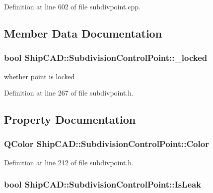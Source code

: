 Definition at line 602 of file subdivpoint.\-cpp.



\subsection{Member Data Documentation}
\hypertarget{classShipCAD_1_1SubdivisionControlPoint_acf4dc0c2a3d4c52847c68a8a412669f5}{
\subsubsection[{\-\_\-locked}]{\setlength{\rightskip}{0pt plus 5cm}bool Ship\-C\-A\-D\-::\-Subdivision\-Control\-Point\-::\-\_\-locked\hspace{0.3cm}{\ttfamily [protected]}}}\label{classShipCAD_1_1SubdivisionControlPoint_acf4dc0c2a3d4c52847c68a8a412669f5}
whether point is locked 

Definition at line 267 of file subdivpoint.\-h.



\subsection{Property Documentation}
\hypertarget{classShipCAD_1_1SubdivisionControlPoint_a8c7a97ce5194163f37a4b655f87bc309}{
\subsubsection[{Color}]{\setlength{\rightskip}{0pt plus 5cm}Q\-Color Ship\-C\-A\-D\-::\-Subdivision\-Control\-Point\-::\-Color\hspace{0.3cm}{\ttfamily [read]}}}\label{classShipCAD_1_1SubdivisionControlPoint_a8c7a97ce5194163f37a4b655f87bc309}


Definition at line 212 of file subdivpoint.\-h.

\hypertarget{classShipCAD_1_1SubdivisionControlPoint_a33a15d8a83f43369313d57a854046ff7}{
\subsubsection[{Is\-Leak}]{\setlength{\rightskip}{0pt plus 5cm}bool Ship\-C\-A\-D\-::\-Subdivision\-Control\-Point\-::\-Is\-Leak\hspace{0.3cm}{\ttfamily [read]}}}\label{classShipCAD_1_1SubdivisionControlPoint_a33a15d8a83f43369313d57a854046ff7}


